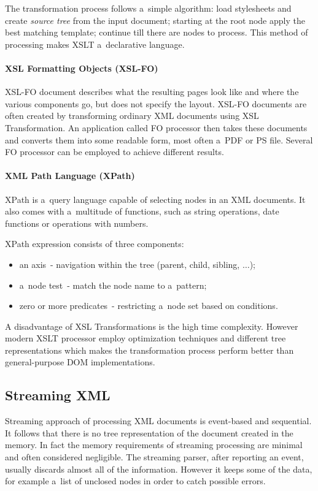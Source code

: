 \documentclass[11pt,oneside,final]{fithesis2}
\begin{document}
The transformation process follows a~simple algorithm: load stylesheets and create \textit{source tree} from the input document; starting at the root node apply the best matching template; continue till there are nodes to process. This method of processing makes XSLT a~declarative language.

\paragraph*{XSL Formatting Objects (XSL-FO)}
\label{xsl:xsl-fo}
XSL-FO document describes what the resulting pages look like and where the various components go, but does not specify the layout. XSL-FO documents are often created by transforming ordinary XML documents using XSL Transformation. An application called FO processor then takes these documents and converts them into some readable form, most often a~PDF or PS file. Several FO processor can be employed to achieve different results.

\paragraph*{XML Path Language (XPath)}
\label{xsl:xpath}
XPath is a~query language capable of selecting nodes in an XML documents. It also comes with a~multitude of functions, such as string operations, date functions or operations with numbers. 

XPath expression consists of three components: 
\begin{itemize}
\item an axis~- navigation within the tree (parent, child, sibling, $\ldots$);
\item a~node test~- match the node name to a~pattern;
\item zero or more predicates~- restricting a~node set based on conditions.
\end{itemize}

A disadvantage of XSL Transformations is the high time complexity. However modern XSLT processor employ optimization techniques and different tree representations which makes the transformation process perform better than general-purpose DOM implementations.

\subsection{Streaming XML}
Streaming approach of processing XML documents is event-based and sequential. It follows that there is no tree representation of the document created in the memory. In fact the memory requirements of streaming processing are minimal and often considered negligible. The streaming parser, after reporting an event, usually discards almost all of the information. However it keeps some of the data, for example a~list of unclosed nodes in order to catch possible errors. 
\end{document}
